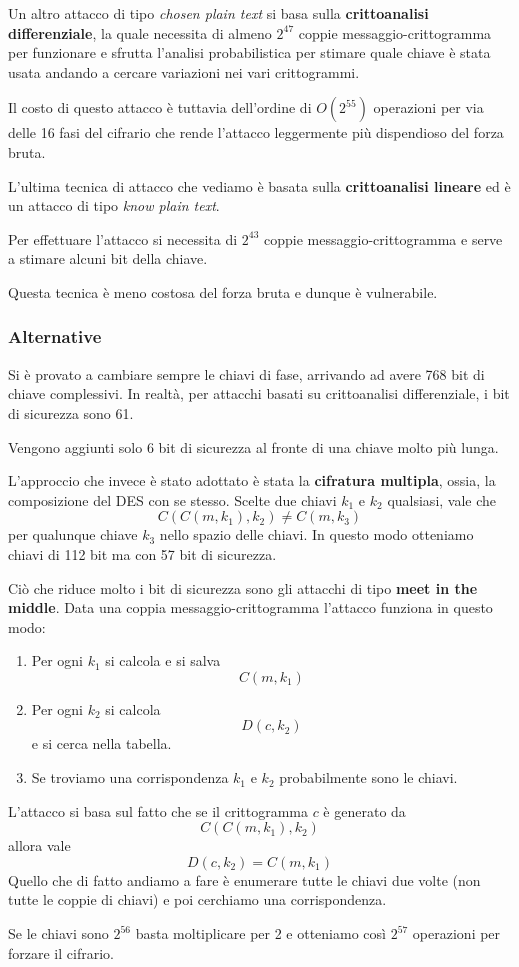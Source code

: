 Un altro attacco di tipo \emph{chosen plain text} si basa sulla \textbf{crittoanalisi differenziale}, la quale necessita
di almeno $2^{47}$ coppie messaggio-crittogramma per funzionare e sfrutta l'analisi probabilistica per stimare quale
chiave \`e stata usata andando a cercare variazioni nei vari crittogrammi.

Il costo di questo attacco \`e tuttavia dell'ordine di $O(2^{55})$ operazioni per via delle 16 fasi del cifrario che
rende l'attacco leggermente pi\`u dispendioso del forza bruta.

L'ultima tecnica di attacco che vediamo \`e basata sulla \textbf{crittoanalisi lineare} ed \`e un attacco di tipo
\emph{know plain text}.

Per effettuare l'attacco si necessita di $2^{43}$ coppie messaggio-crittogramma e serve a stimare alcuni bit della chiave.

Questa tecnica \`e meno costosa del forza bruta e dunque \`e vulnerabile.

\subsubsection{Alternative}
Si \`e provato a cambiare sempre le chiavi di fase, arrivando ad avere 768 bit di chiave complessivi. In realt\`a,
per attacchi basati su crittoanalisi differenziale, i bit di sicurezza sono 61.

Vengono aggiunti solo 6 bit di sicurezza al fronte di una chiave molto pi\`u lunga.

L'approccio che invece \`e stato adottato \`e stata la \textbf{cifratura multipla}, ossia, la composizione del DES con
se stesso. Scelte due chiavi $k_1$ e $k_2$ qualsiasi, vale che
\[ C(C(m, k_1), k_2) \neq C(m, k_3) \]
per qualunque chiave $k_3$ nello spazio delle chiavi. In questo modo otteniamo chiavi di 112 bit ma con 57 bit di
sicurezza.

Ci\`o che riduce molto i bit di sicurezza sono gli attacchi di tipo \textbf{meet in the middle}. Data una coppia
messaggio-crittogramma l'attacco funziona in questo modo:
\begin{enumerate}
	\item Per ogni $k_1$ si calcola e si salva
	      \[ C(m, k_1) \]
	\item Per ogni $k_2$ si calcola
	      \[ D(c, k_2) \]
	      e si cerca nella tabella.
	\item Se troviamo una corrispondenza $k_1$ e $k_2$ probabilmente sono le chiavi.
\end{enumerate}
L'attacco si basa sul fatto che se il crittogramma $c$ \`e generato da
\[ C(C(m, k_1), k_2) \]
allora vale
\[ D(c, k_2) = C(m, k_1) \]
Quello che di fatto andiamo a fare \`e enumerare tutte le chiavi due volte (non tutte le coppie di chiavi) e poi cerchiamo
una corrispondenza.

Se le chiavi sono $2^{56}$ basta moltiplicare per 2 e otteniamo cos\`i $2^{57}$ operazioni per forzare il cifrario.